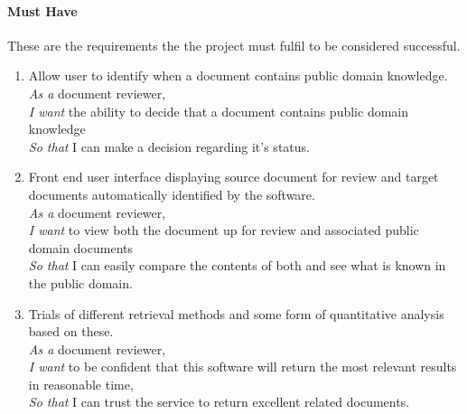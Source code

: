 \documentclass{l4proj}
\begin{document}
\paragraph{Must Have\\}
These are the requirements the the project must fulfil to be considered successful.
\begin{enumerate}[label=\textbf{M.\arabic*}]
\item Allow user to identify when a document contains public domain knowledge. \\
\textit{As a} document reviewer, \\
\textit{I want} the ability to decide that a document contains public domain knowledge \\
\textit{So that} I can make a decision regarding it's status. \\

\item Front end user interface displaying source document for review and target documents automatically identified by the software. \\
\textit{As a} document reviewer, \\
\textit{I want} to view both the document up for review and associated public domain documents \\
\textit{So that} I can easily compare the contents of both and see what is known in the public domain.

\item Trials of different retrieval methods and some form of quantitative analysis based on these. \\
\textit{As a} document reviewer, \\
\textit{I want} to be confident that this software will return the most relevant results in reasonable time, \\
\textit{So that} I can trust the service to return excellent related documents.
\end{enumerate}
\end{document}
